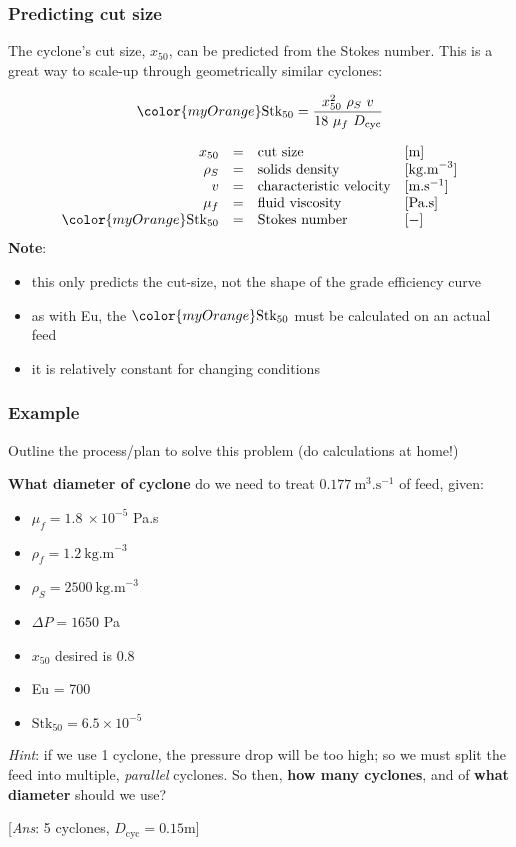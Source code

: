 \begin{frame}\frametitle{Predicting cut size}
	The cyclone's cut size, $x_{50}$, can be predicted from the Stokes number. This is a great way to scale-up through geometrically similar cyclones:
	\begin{exampleblock}{}
		\[{\color{myOrange}\text{Stk}_{50}} = \dfrac{x_{50}^2 \,\,\rho_S \,\,v}{18\,\, \mu_f \,\,D_\text{cyc}}\]
	\end{exampleblock}
	\[
		\begin{array}{rcll}
			x_{50}		&=& \text{cut size} 				&[\text{m}]\\
			\rho_S		&=& \text{solids density} 			&[\text{kg.m}^{-3}]\\
			v 			&=& \text{characteristic velocity} 	&[\text{m.s}^{-1}]\\
			\mu_f	    &=& \text{fluid viscosity}        	&[\text{Pa.s}]\\
			{\color{myOrange}\text{Stk}_{50}} &=& \text{Stokes number}  & [-]
		\end{array}
	\]
	\textbf{Note}: 
	\begin{itemize}
		\item	this only predicts the cut-size, not the shape of the grade efficiency curve
		\item	as with Eu, the ${\color{myOrange}\text{Stk}_{50}}$ must be calculated on an actual feed
		\item	it is relatively constant for changing conditions
	\end{itemize}
\end{frame}

\begin{frame}\frametitle{Example}
	
	Outline the process/plan to solve this problem (do calculations at home!)
	
	\vspace{12pt}
	\textbf{What diameter of cyclone} do we need to treat $0.177~\text{m}^3\text{.s}^{-1}$ of feed, given:
	\begin{itemize}
		\item	$\mu_f = 1.8~\times 10^{-5}$ Pa.s
		\item	$\rho_f = 1.2~\text{kg.m}^{-3}$
		\item	$\rho_S	= 2500~\text{kg.m}^{-3}$
		\item	$\Delta P = 1650$ Pa
		\item	$x_{50}$ desired is 0.8 \micron
		\item	Eu = 700
		\item	$\text{Stk}_{50} = 6.5 \times 10^{-5}$
	\end{itemize}
	\emph{Hint}: if we use 1 cyclone, the pressure drop will be too high; so we must split the feed into multiple, \emph{parallel} cyclones. So then,
	\textbf{how many cyclones}, and of \textbf{what diameter} should we use?
	
	\vspace{8pt}
	{\scriptsize {\color{myOrange}[\emph{Ans}: 5 cyclones, $D_\text{cyc}=0.15$m]}}
\end{frame}

